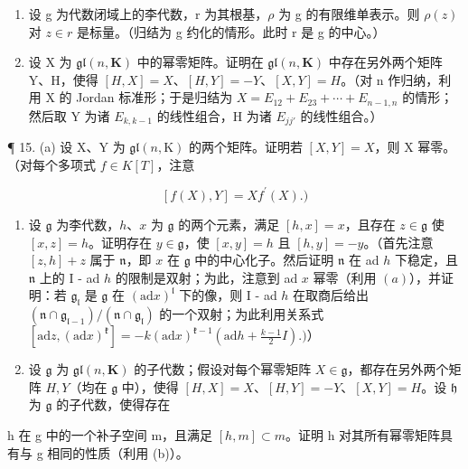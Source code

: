 \begin{enumerate}
\def\labelenumi{\arabic{enumi}.}
\setcounter{enumi}{12}
\item
  设 g 为代数闭域上的李代数，r 为其根基，\(\rho\) 为 g 的有限维单表示。则 \(\rho(z)\) 对 \(z \in r\) 是标量。（归结为 g 约化的情形。此时 r 是 g 的中心。）
\item
  设 X 为 \(\mathfrak{gl}(n, \mathbf{K})\) 中的幂零矩阵。证明在 \(\mathfrak{gl}(n, \mathbf{K})\) 中存在另外两个矩阵 Y、H，使得 \([H, X] = X\)、\([H, Y] = -Y\)、\([X, Y] = H\)。（对 n 作归纳，利用 X 的 Jordan 标准形；于是归结为 \(X = E_{12} + E_{23} + \cdots + E_{n-1,n}\) 的情形；然后取 Y 为诸 \(E_{k,k-1}\) 的线性组合，H 为诸 \(E_{jj'}\) 的线性组合。）
\end{enumerate}

¶ 15. (a) 设 X、Y 为 \(\mathfrak{gl}(n, \mathrm{K})\) 的两个矩阵。证明若 \([X, Y] = X\)，则 X 幂零。（对每个多项式 \(f \in K[T]\)，注意

\[
[ f (X), Y ] = X f ^ {\prime} (X).)
\]

\begin{enumerate}
\def\labelenumi{(\alph{enumi})}
\setcounter{enumi}{1}
\item
  设 \(\mathfrak{g}\) 为李代数，\(h\)、\(x\) 为 \(\mathfrak{g}\) 的两个元素，满足 \([h, x] = x\)，且存在 \(z \in \mathfrak{g}\) 使 \([x, z] = h\)。证明存在 \(y \in \mathfrak{g}\)，使 \([x, y] = h\) 且 \([h, y] = -y\)。（首先注意 \([z, h] + z\) 属于 \(\mathfrak{n}\)，即 \(x\) 在 \(\mathfrak{g}\) 中的中心化子。然后证明 \(\mathfrak{n}\) 在 ad \(h\) 下稳定，且 \(\mathfrak{n}\) 上的 I - ad \(h\) 的限制是双射；为此，注意到 ad \(x\) 幂零（利用 \((a)\)），并证明：若 \(\mathfrak{g}_{\mathfrak{l}}\) 是 \(\mathfrak{g}\) 在 \((\mathrm{ad}x)^{\mathfrak{l}}\) 下的像，则 I - ad \(h\) 在取商后给出 \((\mathfrak{n} \cap \mathfrak{g}_{\mathfrak{l}-1}) / (\mathfrak{n} \cap \mathfrak{g}_{\mathfrak{l}})\) 的一个双射；为此利用关系式 \([\mathrm{ad}z, (\mathrm{ad}x)^{\mathfrak{k}}] = -k(\mathrm{ad}x)^{\mathfrak{k}-1}(\mathrm{ad}h + \frac{k-1}{2}I).)\)）
\item
  设 \(\mathfrak{g}\) 为 \(\mathfrak{gl}(n, \mathbf{K})\) 的子代数；假设对每个幂零矩阵 \(X \in \mathfrak{g}\)，都存在另外两个矩阵 \(H, Y\)（均在 \(\mathfrak{g}\) 中），使得 \([H, X] = X\)、\([H, Y] = -Y\)、\([X, Y] = H\)。设 \(\mathfrak{h}\) 为 \(\mathfrak{g}\) 的子代数，使得存在
\end{enumerate}

h 在 g 中的一个补子空间 m，且满足 \([h, m] \subset m\)。证明 h 对其所有幂零矩阵具有与 g 相同的性质（利用 (b)）。

